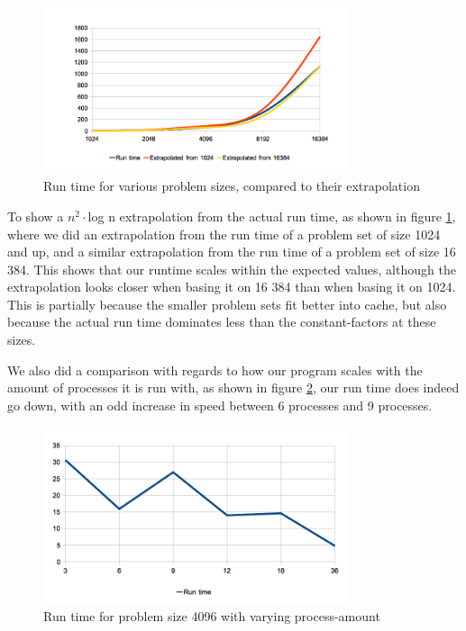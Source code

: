\begin{figure}[t]
  \centering
    \includegraphics[width=0.8\textwidth]{speed_over_size_3.png}
    \caption{Run time for various problem sizes, compared to their extrapolation}
    \label{runsize}
\end{figure}

To show a $n^2\cdot$log n extrapolation from the actual run time, as shown in figure \ref{runsize}, where we did an extrapolation from the run time of a problem set of size 1024 and up, and a similar extrapolation from the run time of a problem set of size 16 384. This shows that our runtime scales within the expected values, although the extrapolation looks closer when basing it on 16 384 than when basing it on 1024. This is partially because the smaller problem sets fit better into cache, but also because the actual run time dominates less than the constant-factors at these sizes.

We also did a comparison with regards to how our program scales with the amount of processes it is run with,
as shown in figure \ref{numprocs}, our run time does indeed go down, with an odd increase in speed between 6 processes and 9 processes.
\begin{figure}[t]
  \centering
    \includegraphics[width=0.8\textwidth]{run_time_over_np.png}
    \caption{Run time for problem size 4096 with varying process-amount}
    \label{numprocs}
\end{figure}

\FloatBarrier
